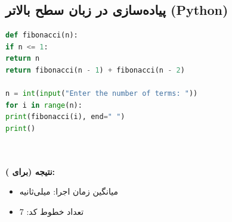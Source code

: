 \documentclass[12pt, a4paper]{report}
\begin{document}
\subsection{پیاده‌سازی در زبان سطح بالاتر (Python)}
\begin{LTR}
	\begin{lstlisting}[language=Python, breaklines=true]
def fibonacci(n):
if n <= 1:
return n
return fibonacci(n - 1) + fibonacci(n - 2)

n = int(input("Enter the number of terms: "))
for i in range(n):
print(fibonacci(i), end=" ")
print()

		
	\end{lstlisting}
\end{LTR}

\textbf{نتیجه (برای ):}
\begin{itemize}
	\item میانگین زمان اجرا: \textnormal{} میلی‌ثانیه
	\item تعداد خطوط کد: \textnormal{7}
\end{itemize}

\begin{thebibliography}{99}
	 \href{https://en.cppreference.com/}{}
	 \href{https://chatgpt.com}{}
	 \href{https://geeksforgeeks.org}{}
	 \href{https://stackoverflow.com/}{}
	 \href{https://devdocs.io/cpp/}{}
	 \href{https://www.learncpp.com/}{}
	 \href{https://yanniss.github.io/lc++/}{}
\end{thebibliography}
\end{document}
